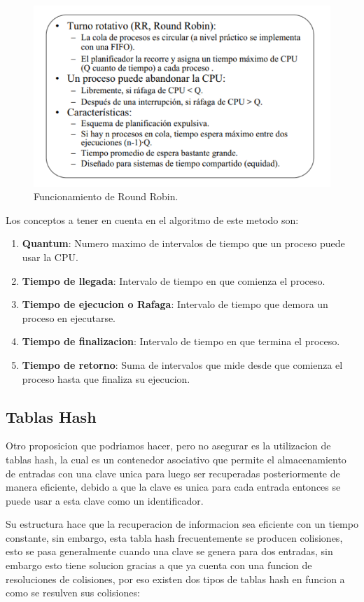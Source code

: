 \documentclass[conference,letterpaper]{IEEEtran}
\begin{document}
\begin{figure}[thpb]
      \centering
      \includegraphics[width=0.55\linewidth]{rr.png}
      \caption{Funcionamiento de Round Robin.}
      \label{fig:RR}
\end{figure}

Los conceptos a tener en cuenta en el algoritmo de este metodo son:
\begin{enumerate}
    \item \textbf{Quantum}: Numero maximo de intervalos de tiempo que un proceso puede usar la CPU.
    \item \textbf{Tiempo de llegada}: Intervalo de tiempo en que comienza el proceso.
    \item \textbf{Tiempo de ejecucion o Rafaga}: Intervalo de tiempo que demora un proceso en ejecutarse.
    \item \textbf{Tiempo de finalizacion}: Intervalo de tiempo en que termina el proceso.
    \item \textbf{Tiempo de retorno}: Suma de intervalos que mide desde que comienza el proceso hasta que finaliza su ejecucion.
\end{enumerate}

\subsection{Tablas Hash}
Otro proposicion que podriamos hacer, pero no asegurar es la utilizacion de tablas hash, la cual es un contenedor asociativo que permite el almacenamiento de entradas con una clave unica para luego ser recuperadas posteriormente de manera eficiente, debido a que la clave es unica para cada entrada entonces se puede usar a esta clave como un identificador.

Su estructura hace que la recuperacion de informacion sea eficiente con un tiempo constante, sin embargo, esta tabla hash frecuentemente se producen colisiones, esto se pasa generalmente cuando una clave se genera para dos entradas, sin embargo esto tiene solucion gracias a que ya cuenta con una funcion de resoluciones de colisiones, por eso existen dos tipos de tablas hash en funcion a como se resulven sus colisiones:
\end{document}
